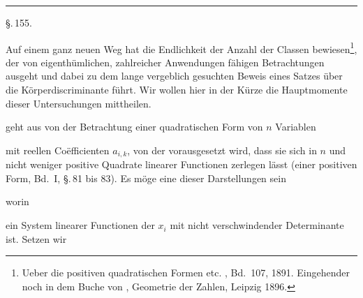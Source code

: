 \begin{center}


\rule{0.3\textwidth}{0.4pt}

\S.\,155.

\end{center}

Auf einem ganz neuen Weg hat  die Endlichkeit der Anzahl der Classen bewiesen\footnote{Ueber die positiven quadratischen Formen etc. , Bd.\ 107, 1891. Eingehender noch in dem Buche von , \glqq{}Geometrie der Zahlen\grqq{}, Leipzig 1896.}, der von eigenthümlichen, zahlreicher Anwendungen fähigen Betrachtungen ausgeht und dabei zu dem lange vergeblich gesuchten Beweis eines Satzes über die Körperdiscriminante führt. Wir wollen hier in der Kürze die Hauptmomente dieser Untersuchungen mittheilen.

 geht aus von der Betrachtung einer quadratischen Form von $n$ Variablen


mit reellen Co\"efficienten $a_{i,k}$, von der vorausgesetzt wird, dass sie sich in $n$ und nicht weniger positive Quadrate linearer Functionen zerlegen lässt (einer positiven Form, Bd.\ I, \S.\,81 bis 83). Es möge eine dieser Darstellungen sein

worin

ein System linearer Functionen der $x_i$ mit nicht verschwindender Determinante ist. Setzen wir

